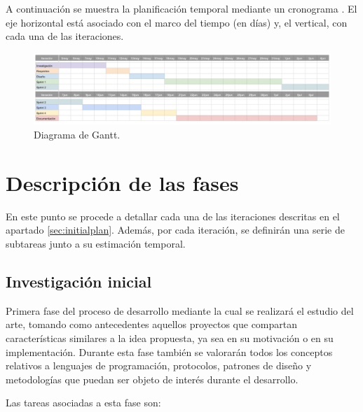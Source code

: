 A continuación se muestra la planificación temporal mediante un cronograma . El eje horizontal está asociado con el marco del tiempo (en días) y, el vertical, con cada una de las iteraciones.\sn

\begin{figure}[h]
    \centering
    \includegraphics[width=15cm]{img/tables/08_Planned-Gantt.png}
    \caption{Diagrama de Gantt.}
    \label{fig:gantt}
\end{figure}


\section{Descripción de las fases} \label{sec:phases}

En este punto se procede a detallar cada una de las iteraciones descritas en el apartado \ref{sec:initialplan}. Además, por cada iteración, se definirán una serie de subtareas junto a su estimación temporal.\n

\subsection{Investigación inicial} \label{sub:initialinv}

Primera fase del proceso de desarrollo mediante la cual se realizará el estudio del arte, tomando como antecedentes aquellos proyectos que compartan características similares a la idea propuesta, ya sea en su motivación o en su implementación. Durante esta fase también se valorarán todos los conceptos relativos a lenguajes de programación, protocolos, patrones de diseño y metodologías que puedan ser objeto de interés durante el desarrollo.\sn

Las tareas asociadas a esta fase son:\sn

